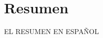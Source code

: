 \documentclass[../main.tex]{subfiles}
\begin{document}
\chapter*{Resumen}\label{ch:es_abstract}
\thispagestyle{empty}
EL RESUMEN EN ESPAÑOL
\end{document}
